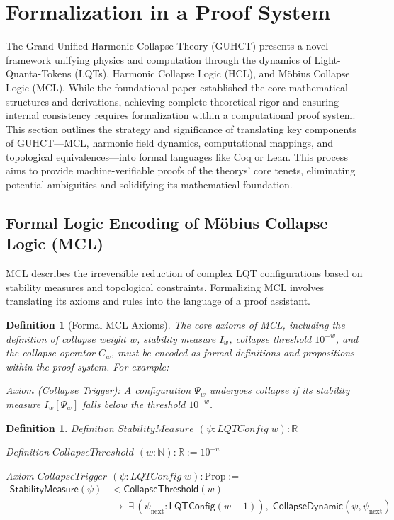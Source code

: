 \documentclass[11pt,a4paper]{article}
\newtheorem{definition}[theorem]{Definition}
\begin{document}

\section{Formalization in a Proof System}
\label{sec:formalization}

The Grand Unified Harmonic Collapse Theory (GUHCT) presents a novel framework unifying physics and computation through the dynamics of Light-Quanta-Tokens (LQTs), Harmonic Collapse Logic (HCL), and Möbius Collapse Logic (MCL). While the foundational paper established the core mathematical structures and derivations, achieving complete theoretical rigor and ensuring internal consistency requires formalization within a computational proof system. This section outlines the strategy and significance of translating key components of GUHCT—MCL, harmonic field dynamics, computational mappings, and topological equivalences—into formal languages like Coq or Lean. This process aims to provide machine-verifiable proofs of the theorys' core tenets, eliminating potential ambiguities and solidifying its mathematical foundation.

\subsection{Formal Logic Encoding of M\"obius Collapse Logic (MCL)}
\label{subsec:mcl_formalization}

MCL describes the irreversible reduction of complex LQT configurations based on stability measures and topological constraints. Formalizing MCL involves translating its axioms and rules into the language of a proof assistant.

\begin{definition}[Formal MCL Axioms]
The core axioms of MCL, including the definition of collapse weight $w$, stability measure $I_w$, collapse threshold $10^{-w}$, and the collapse operator $C_w$, must be encoded as formal definitions and propositions within the proof system. For example:

\textit{Axiom (Collapse Trigger):} A configuration $\Psi_w$ undergoes collapse if its stability measure $I_w[\Psi_w]$ falls below the threshold $10^{-w}$.
\end{definition}

\begin{definition}
Definition $StabilityMeasure$ $(\psi : LQTConfig\;w) : \mathbb{R}$

Definition $CollapseThreshold$ $(w : \mathbb{N}) : \mathbb{R} := 10^{-w}$

Axiom $CollapseTrigger$ $(\psi : LQTConfig\;w) : \mathrm{Prop} :=$
\begin{align*}
\textsf{StabilityMeasure}(\psi) &< \textsf{CollapseThreshold}(w) \\
&\longrightarrow\;
\exists\,(\psi_{\text{next}} : \textsf{LQTConfig}(w{-}1)),\;
\textsf{CollapseDynamic}(\psi, \psi_{\text{next}})
\end{align*}

\end{definition}
\end{document}
